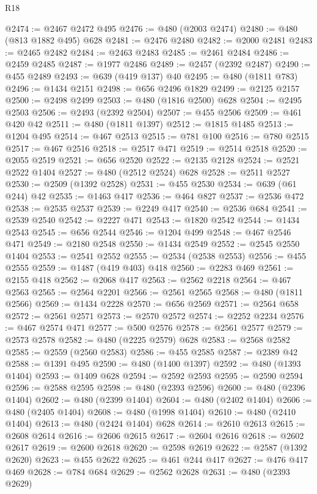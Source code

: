\begin{lexlean}{R18}
\begin{coremodule}
{{{{{{{{{{{{{{{{{{{{{{{{{{{{{{{{{{{{{{{{{{{{{{{{{{{{{{{{{{{{{{{{{{{{{{{{{{{{{{{{{{{{{{{{{{{{{{{{{{{{{{{{{{{{{@2474 := @2467 @2472 @495
@2476 := @480 (@2003 @2474)
@2480 := @480 (@813 @1882 @495) @628
@2481 := @2476 @2480
@2482 := @2000 @2481
@2483 := @2465 @2482
@2484 := @2463 @2483
@2485 := @2461 @2484
@2486 := @2459 @2485
@2487 := @1977 @2486
@2489 := @2457 (@2392 @2487)
@2490 := @455 @2489
@2493 := @639 (@419 @137) @40
@2495 := @480 (@1811 @783)
@2496 := @1434 @2151
@2498 := @656 @2496 @1829
@2499 := @2125 @2157
@2500 := @2498 @2499
@2503 := @480 (@1816 @2500) @628
@2504 := @2495 @2503
@2506 := @2493 (@2392 @2504)
@2507 := @455 @2506
@2509 := @461 @420 @42
@2511 := @480 (@1811 @1397)
@2512 := @1815 @1485
@2513 := @1204 @495
@2514 := @467 @2513
@2515 := @781 @100
@2516 := @780 @2515
@2517 := @467 @2516
@2518 := @2517 @471
@2519 := @2514 @2518
@2520 := @2055 @2519
@2521 := @656 @2520
@2522 := @2135 @2128
@2524 := @2521 @2522 @1404
@2527 := @480 (@2512 @2524) @628
@2528 := @2511 @2527
@2530 := @2509 (@1392 @2528)
@2531 := @455 @2530
@2534 := @639 (@61 @244) @42
@2535 := @1463 @417
@2536 := @464 @827
@2537 := @2536 @472
@2538 := @2535 @2537
@2539 := @2249 @417
@2540 := @2536 @684
@2541 := @2539 @2540
@2542 := @2227 @471
@2543 := @1820 @2542
@2544 := @1434 @2543
@2545 := @656 @2544
@2546 := @1204 @499
@2548 := @467 @2546 @471
@2549 := @2180 @2548
@2550 := @1434 @2549
@2552 := @2545 @2550 @1404
@2553 := @2541 @2552
@2555 := @2534 (@2538 @2553)
@2556 := @455 @2555
@2559 := @1487 (@419 @403) @418
@2560 := @2283 @469
@2561 := @2155 @418
@2562 := @2068 @417
@2563 := @2562 @2218
@2564 := @467 @2563
@2565 := @2564 @2201
@2566 := @2561 @2565
@2568 := @480 (@1811 @2566)
@2569 := @1434 @2228
@2570 := @656 @2569
@2571 := @2564 @658
@2572 := @2561 @2571
@2573 := @2570 @2572
@2574 := @2252 @2234
@2576 := @467 @2574 @471
@2577 := @500 @2576
@2578 := @2561 @2577
@2579 := @2573 @2578
@2582 := @480 (@2225 @2579) @628
@2583 := @2568 @2582
@2585 := @2559 (@2560 @2583)
@2586 := @455 @2585
@2587 := @2389 @42
@2588 := @1391 @495
@2590 := @480 (@1400 @1397)
@2592 := @480 (@1393 @1404)
@2593 := @1409 @628
@2594 := @2592 @2593
@2595 := @2590 @2594
@2596 := @2588 @2595
@2598 := @480 (@2393 @2596)
@2600 := @480 (@2396 @1404)
@2602 := @480 (@2399 @1404)
@2604 := @480 (@2402 @1404)
@2606 := @480 (@2405 @1404)
@2608 := @480 (@1998 @1404)
@2610 := @480 (@2410 @1404)
@2613 := @480 (@2424 @1404) @628
@2614 := @2610 @2613
@2615 := @2608 @2614
@2616 := @2606 @2615
@2617 := @2604 @2616
@2618 := @2602 @2617
@2619 := @2600 @2618
@2620 := @2598 @2619
@2622 := @2587 (@1392 @2620)
@2623 := @455 @2622
@2625 := @461 @244 @417
@2627 := @476 @417 @469
@2628 := @784 @684
@2629 := @2562 @2628
@2631 := @480 (@2393 @2629)
}}}}}}}}}}}}}}}}}}}}}}}}}}}}}}}}}}}}}}}}}}}}}}}}}}}}}}}}}}}}}}}}}}}}}}}}}}}}}}}}}}}}}}}}}}}}}}}}}}}}}}}}}}}}}
\end{coremodule}
\end{lexlean}
